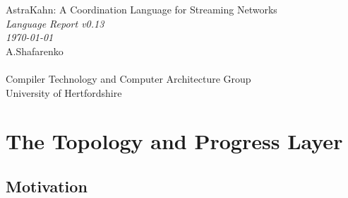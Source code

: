 \documentclass[11pt]{report}
\date{}
\begin{document}
\begin{titlepage}
\begin{center}
\vspace{0.5in}
{\Huge AstraKahn: A Coordination Language for Streaming Networks}\\
\vspace{0.5in}
{\Huge\it Language Report v0.13 \\
\today\\}
\vspace{0.5in}
{\Large
A.Shafarenko\\
\ \\
Compiler Technology and Computer Architecture Group\\
University of Hertfordshire
}
\end{center}
\begin{abstract}
This is a preliminary version of the language report. It contains key definitions, specifications and some examples, but lacks completeness. The full document will include Chapter 3 (Data and Instrumentation Layer) and an appendix giving the complete syntax and some whole program examples. The purpose of the present document is to fix the concepts and major features of the language and to enable the production of the definition document that is required for implementation.

{\bf Acknowledgements} We acknowledge the help of  colleagues in shaping up the present report. The subject matter was repeatedly discussed with Dr Raphael Poss to whom we are indebted for drawing our attention to map-reduce parallelism, and who also provided  invaluable critique elsewhere. We also wish to thank Dr Raimund Kirner for his input in regard of reat-time considerations and possible integration of the language with a real-time programming environment, and Mr Pavels Zaichenkovs for suggestions that improved the the syntax of MDL.
\end{abstract}
\end{titlepage}
\chapter{The Topology and Progress Layer}
\section{Motivation}
\end{document}
